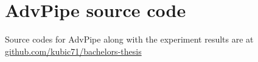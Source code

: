\pagebreak
\section{AdvPipe source code}
Source codes for AdvPipe along with the experiment results are at \\ \href{https://github.com/kubic71/bachelors-thesis}{github.com/kubic71/bachelors-thesis}




